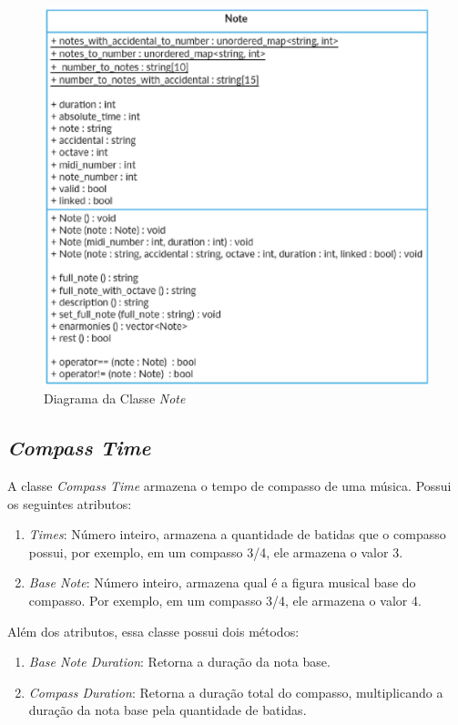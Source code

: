       \begin{figure}[htb]
        \centering
        \includegraphics[scale=0.7]{figuras/noteclass.eps}
        \caption{Diagrama da Classe \textit{Note}}
        \label{noteclass}
      \end{figure}

    \subsection[\textit{Compass Time}]{\textit{Compass Time}}

      A classe \textit{Compass Time} armazena o tempo de compasso de uma música. Possui os seguintes atributos:

      \begin{enumerate}
        \item \textit{Times}: Número inteiro, armazena a quantidade de batidas que o compasso possui, por exemplo, em um compasso 3/4, ele armazena o valor 3.
        \item \textit{Base Note}: Número inteiro, armazena qual é a figura musical base do compasso. Por exemplo, em um compasso 3/4, ele armazena o valor 4.
      \end{enumerate}

      Além dos atributos, essa classe possui dois métodos:

      \begin{enumerate}
        \item \textit{Base Note Duration}: Retorna a duração da nota base.
        \item \textit{Compass Duration}: Retorna a duração total do compasso, multiplicando a duração da nota base pela quantidade de batidas.
      \end{enumerate}


